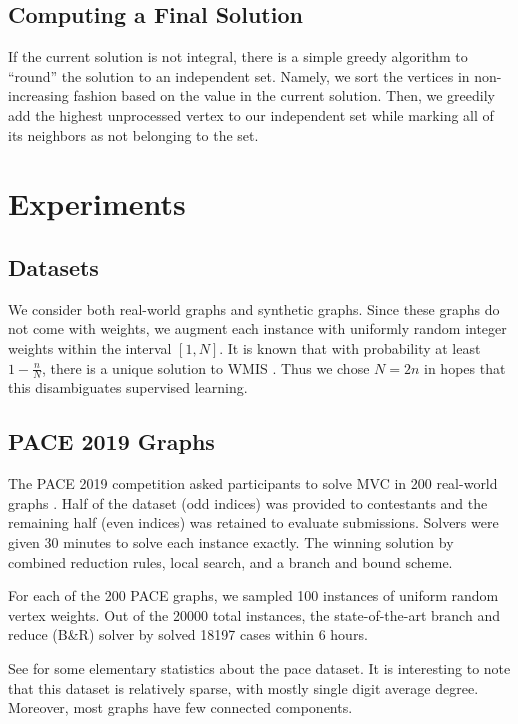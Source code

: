 \documentclass{article}
\begin{document}
\subsection{Computing a Final Solution}
If the current solution is not integral,
there is a simple greedy algorithm to ``round'' the solution to an independent set.
Namely, we sort the vertices in non-increasing fashion based on the value in the current solution.
Then, we greedily add the highest unprocessed vertex to our independent set
while marking all of its neighbors as not belonging to the set.

\section{Experiments}
\subsection{Datasets}
We consider both real-world graphs and synthetic graphs.
Since these graphs do not come with weights,
we augment each instance with uniformly random integer weights within the interval $[1, N]$.
It is known that with probability at least $1-\frac nN$,
there is a unique solution to WMIS \citet{isolation}.
Thus we chose $N = 2n$ in hopes that this disambiguates supervised learning.

\subsection{PACE 2019 Graphs}
The PACE 2019 competition asked participants to solve MVC in 200 real-world graphs \citet{pace2019}.
Half of the dataset (odd indices) was provided to contestants
and the remaining half (even indices) was retained to evaluate submissions.
Solvers were given 30 minutes to solve each instance exactly.
The winning solution by \citet{wegotyoucovered} combined reduction rules,
local search, and a branch and bound scheme.

For each of the 200 PACE graphs,
we sampled 100 instances of uniform random vertex weights.
Out of the 20000 total instances,  
the state-of-the-art branch and reduce (B\&R) solver by \citet{kamis} solved 18197 cases within 6 hours.

See  for some elementary statistics about the pace dataset.
It is interesting to note that this dataset is relatively sparse,
with mostly single digit average degree.
Moreover, most graphs have few connected components.
\end{document}
